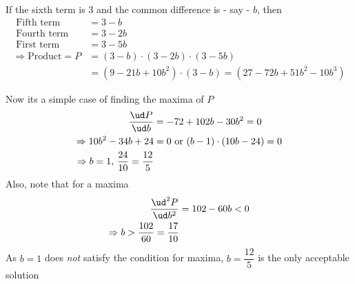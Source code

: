 \begin{solution}[\fullpage]
	If the sixth term is 3 and the common difference is - say - $b$, then 
	\begin{align}
		\text{ Fifth term } &= 3-b \\
		\text{ Fourth term } &= 3-2b \\
		\text{ First term } &= 3-5b \\
		\Rightarrow \text{Product} = P &= (3-b)\cdot(3-2b)\cdot(3-5b) \\
		&= (9-21b+10b^2)\cdot(3-b) = (27-72b+51b^2-10b^3)
	\end{align}
	
	Now its a simple case of finding the maxima of $P$
	\begin{align}
		\dfrac{\ud P}{\ud b} &= -72 + 102b - 30b^2 = 0 \\
		\Rightarrow 10b^2 - 34b + 24 &= 0 \text{ or } (b-1)\cdot(10b-24) = 0 \\
		\Rightarrow b = 1,\, \frac{24}{10} = \frac{12}{5}
	\end{align}
	Also, note that for a maxima
	\begin{align}
		\dfrac{\ud^2 P}{\ud b^2} &= 102 - 60b < 0 \\
		\Rightarrow b > \frac{102}{60} = \frac{17}{10}
	\end{align}
	As $b = 1$ does \textit{not} satisfy the condition for maxima, $b = \dfrac{12}{5}$ is 
	the only acceptable solution
\end{solution}
